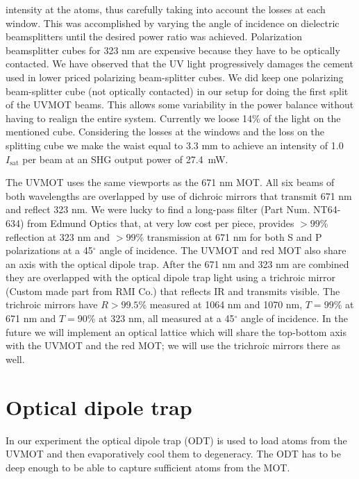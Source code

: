 \documentclass[oneside,12pt]{memoir}
\newcommand{\isat}{ \ensuremath{ I_{\mathrm{sat}} } }
\begin{document}
intensity at the atoms, thus carefully taking into account the losses at each
window.  This was accomplished by varying the angle of incidence on dielectric
beamsplitters until the desired power ratio was achieved.  Polarization
beamsplitter cubes for 323 nm are expensive because they have to be optically
contacted.  We have observed that the UV light progressively damages the cement
used in lower priced polarizing beam-splitter cubes.  We did keep one
polarizing beam-splitter cube (not optically contacted) in our setup for doing
the first split of the UVMOT beams.  This allows some variability in the power
balance without having to realign the entire system.  Currently we loose 14\%
of the light on the mentioned cube.  Considering the losses at the windows and
the loss on the splitting cube we make the waist equal to 3.3 mm to achieve an
intensity of 1.0\isat per beam at an SHG output power of 27.4~mW.  

The UVMOT uses the same viewports as the 671 nm MOT. All six beams of both
wavelengths are overlapped by use of dichroic mirrors that transmit 671 nm and
reflect 323 nm.  We were lucky to find a long-pass filter (Part Num. NT64-634)
from Edmund Optics that, at very low cost per piece, provides $>99$\%
reflection at 323 nm and $>99$\% transmission at 671 nm for both S and P
polarizations at a 45$^{\circ}$ angle of incidence.  The UVMOT and red MOT also
share an axis with the optical dipole trap.  After the 671 nm and 323 nm are
combined they are overlapped with the optical dipole trap light using a
trichroic mirror (Custom made part from RMI Co.)  that reflects IR and
transmits visible.  The trichroic mirrors have $R>99.5$\% measured at 1064 nm
and 1070 nm,  $T=99$\% at 671 nm and $T=90$\% at 323 nm, all measured at a
45$^{\circ}$ angle of incidence.   In the future we will implement an optical
lattice which will share the top-bottom axis with the UVMOT and the red MOT; we
will use the trichroic mirrors there as well.


\section{Optical dipole trap}

In our experiment the optical dipole trap (ODT) is used to load atoms from the
UVMOT and then evaporatively cool them to degeneracy. The ODT has to be deep
enough to be able to capture sufficient atoms from the MOT. 
\end{document}
